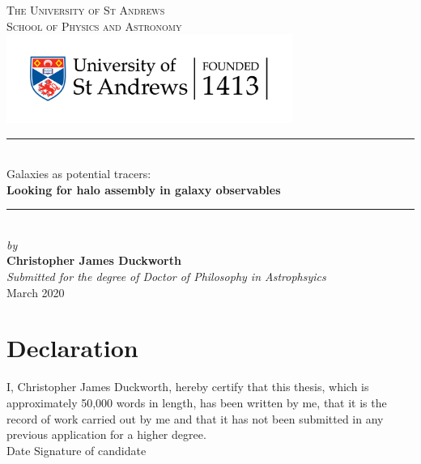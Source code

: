 \documentclass[11pt]{book}
\begin{document}
\pagestyle{empty}

\begin{titlepage}
\newcommand{\HRule}{\rule{\linewidth}{0.5mm}}
\center
\vspace*{0.3cm}
\textsc{\LARGE The University of St Andrews}\\[0.1cm] %
\textsc{\Large School of Physics and Astronomy}\\[3cm] %
\includegraphics[width=0.7\textwidth]{thesis/latex/st_a_logo_.png}

\HRule \\[0.4cm]
{ \LARGE Galaxies as potential tracers: \Large \\[0.2cm] \textbf{Looking for halo assembly in galaxy observables}}\\[0.4cm] %
\HRule \\[1.6cm]
\Large
\textsl{by} \\
\textbf{Christopher James Duckworth}
\\
\vspace*{2cm}
\textsl{\Large Submitted for the degree of Doctor of Philosophy in Astrophsyics}\\[0.6cm] %
{\Large {March 2020}}\\[3cm]
\vfill %

\end{titlepage}

\frontmatter

\chapter{Declaration}

I, Christopher James Duckworth, hereby certify that this thesis, which is approximately 50,000 words in length, has been written by me, that it is the record of work carried out by me and that it has not been submitted in any previous application for a higher degree.\\

Date  \hspace{1.8in} Signature of candidate \\
\end{document}

